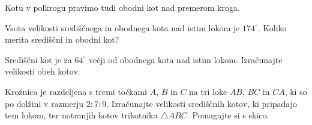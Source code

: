 \begin{izrek}
\begin{figure}[H]
    \end{figure}
\end{izrek}

    Kotu v polkrogu pravimo tudi obodni kot nad premerom kroga.




\begin{naloga}
    Vsota velikosti središčnega in obodnega kota nad istim lokom je $174^\circ$. 
    Koliko merita središčni in obodni kot?
\end{naloga}

\begin{naloga}
    Središčni kot je za $64^\circ$ večji od obodnega kota nad istim lokom. 
    Izračunajte velikosti obeh kotov.
\end{naloga}

\begin{naloga}
    Krožnica je razdeljena s tremi točkami $A$, $B$ in $C$ na tri loke $AB$, $BC$ in $CA$, 
    ki so po dolžini v razmerju $2:7:9$.
    Izračunajte velikosti središčnih kotov, ki pripadajo tem lokom, ter notranjih kotov trikotnika $\triangle ABC$.
    Pomagajte si s skico.
\end{naloga}




